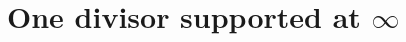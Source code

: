 \documentclass[11pt, a4paper]{amsart}
\newcommand{\Q}{\mathbb{Q}}
\newcommand{\ord}{\operatorname{ord}}
\newtheorem{cond}{Condition}
\theoremstyle{remark}
\newtheorem{remark}[theorem]{Remark}
\numberwithin{equation}{section}
\newcommand{\sg}{{}}
\begin{document}

\sg{\section{One divisor supported at $\infty$}\label{sec:Even-two-infinities}}
\end{document}
